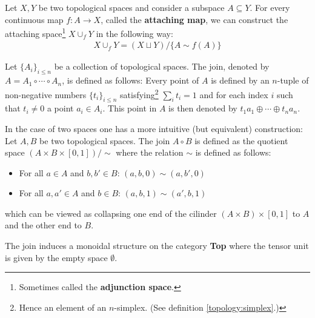     \begin{construct}\label{topology:attaching_space}
        Let $X, Y$ be two topological spaces and consider a subspace $A\subseteq Y$. For every continuous map $f:A\rightarrow X$, called the \textbf{attaching map}, we can construct the attaching space\footnote{Sometimes called the \textbf{adjunction space}.} $X\cup_f Y$ in the following way:
        \begin{gather}
            X\cup_f Y = (X\sqcup Y)/\{A\sim f(A)\}
        \end{gather}
    \end{construct}

    \begin{construct}[Join]
        Let $\{A_i\}_{i\leq n}$ be a collection of topological spaces. The join, denoted by $A=A_1\circ\cdots\circ A_n$, is defined as follows: Every point of $A$ is defined by an $n$-tuple of non-negative numbers $\{t_i\}_{i\leq n}$ satisfying\footnote{Hence an element of an $n$-simplex. (See definition \ref{topology:simplex}.)} $\sum_it_i=1$ and for each index $i$ such that $t_i\neq 0$ a point $a_i\in A_i$. This point in $A$ is then denoted by $t_1a_1\oplus\cdots\oplus t_na_n$.

        In the case of two spaces one has a more intuitive (but equivalent) construction: Let $A, B$ be two topological spaces. The join $A\circ B$ is defined as the quotient space $(A\times B\times [0, 1])/\sim$ where the relation $\sim$ is defined as follows:
        \begin{itemize}
            \item For all $a\in A$ and $b, b'\in B$: $(a, b, 0)\sim(a, b', 0)$
            \item For all $a, a'\in A$ and $b\in B$: $(a, b, 1)\sim(a', b, 1)$
        \end{itemize}
        which can be viewed as collapsing one end of the cilinder $(A\times B)\times[0, 1]$ to $A$ and the other end to $B$.
    \end{construct}
    \begin{property}
        The join induces a monoidal structure on the category \textbf{Top} where the tensor unit is given by the empty space $\emptyset$.
    \end{property}


